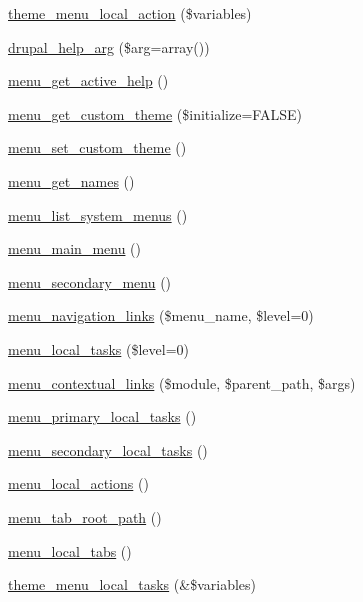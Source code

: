 \begin{DoxyCompactItemize}
\item 
\hyperlink{group__themeable_ga192701ba5ebb20f4d315f84baaf6689e}{theme\_\-menu\_\-local\_\-action} (\$variables)
\item 
\hyperlink{group__menu_ga00dce79e81030a75c94c7a279794b253}{drupal\_\-help\_\-arg} (\$arg=array())
\item 
\hyperlink{group__menu_ga21c6572391132f4e1f5b3fd108220bf4}{menu\_\-get\_\-active\_\-help} ()
\item 
\hyperlink{group__menu_gaf00aa2604e9ad7c0ff0faa6cbc301da8}{menu\_\-get\_\-custom\_\-theme} (\$initialize=FALSE)
\item 
\hyperlink{group__menu_ga2545be84d84b98f84857bea11f7961fb}{menu\_\-set\_\-custom\_\-theme} ()
\item 
\hyperlink{group__menu_gad15183a10857a4a4ad0504ec830443d3}{menu\_\-get\_\-names} ()
\item 
\hyperlink{group__menu_ga28e765ff428a3f18978af564ee0147d6}{menu\_\-list\_\-system\_\-menus} ()
\item 
\hyperlink{group__menu_ga47957cf684d4a76b6e8a5eac09d2db94}{menu\_\-main\_\-menu} ()
\item 
\hyperlink{group__menu_gaf4a8dad6070035a498c598c5fe9ca255}{menu\_\-secondary\_\-menu} ()
\item 
\hyperlink{group__menu_gab4cdacc813ae9e06271aa4aa2d9495a7}{menu\_\-navigation\_\-links} (\$menu\_\-name, \$level=0)
\item 
\hyperlink{group__menu_gadb8bb3644e114166950142280085cf3e}{menu\_\-local\_\-tasks} (\$level=0)
\item 
\hyperlink{group__menu_gad524d9a3415e24d27c7dbcb333d96cf8}{menu\_\-contextual\_\-links} (\$module, \$parent\_\-path, \$args)
\item 
\hyperlink{group__menu_ga83613b83f90d6a12e2f4170ed0ede9b1}{menu\_\-primary\_\-local\_\-tasks} ()
\item 
\hyperlink{group__menu_gabf84c295da2c986cd8ad305935e31ffb}{menu\_\-secondary\_\-local\_\-tasks} ()
\item 
\hyperlink{group__menu_ga150a37ede061833b2b9fde658d005426}{menu\_\-local\_\-actions} ()
\item 
\hyperlink{group__menu_gacf647362fc7151bbaa1dbe5568a0b6b5}{menu\_\-tab\_\-root\_\-path} ()
\item 
\hyperlink{group__menu_ga9fe648c89a4e94e63c7a88076ed12a94}{menu\_\-local\_\-tabs} ()
\item 
\hyperlink{group__themeable_ga86d3fc6b53bc1455c044e181b0501da0}{theme\_\-menu\_\-local\_\-tasks} (\&\$variables)

\end{DoxyCompactItemize}
